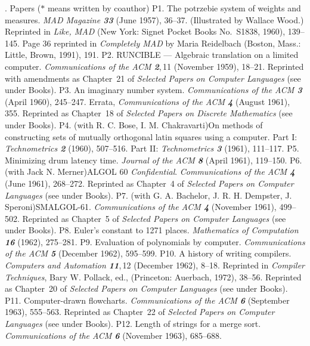 . {Papers \rm($\ast$ means written by coauthor)}
\p  P1.  The potrzebie system of weights and measures.  {\sl MAD Magazine\/
 \bf 33} (June 1957), 36--37.  (Illustrated by Wallace Wood.)  Reprinted 
 in {\sl Like, MAD\/} (New York:  Signet Pocket Books No.~S1838, 1960), 
 139--145. Page 36 reprinted in {\sl Completely MAD\/} by Maria Reidelbach
 (Boston, Mass.: Little, Brown, 1991), 191.
\p P2.  RUNCIBLE --- Algebraic translation on a limited computer.
 {\sl Commun\-i\-ca\-tions of the ACM\/ \bf 2},\,11 (November 1959), 18--21.  
 Reprinted with amendments as Chapter~21 of {\sl Selected Papers on
 Computer Languages\/} (see under Books).
\p P3.  An imaginary number system.  {\sl Communications of the
 ACM\/ \bf 3} (April 1960), 245--247.  Errata, {\sl Communications of the 
 ACM\/ \bf 4} (August 1961), 355.
 Reprinted as Chapter~18 of {\sl Selected Papers on
 Discrete Mathematics\/} (see under Books).
\p *P4.  (with R. C. Bose, I. M. Chakravarti)\xskip  On methods of constructing
 sets of mutually orthogonal latin squares using a computer.  Part I:
 {\sl Technometrics\/ \bf 2} (1960), 507--516.  Part II:  {\sl Technometrics\/
 \bf 3} (1961), 111--117.  
\p P5.  Minimizing drum latency time.  {\sl Journal of the 
 ACM\/ \bf 8} (April 1961), 119--150.  
\p P6.  (with Jack N. Merner)\xskip  ALGOL 60 {\it Confidential\/}.
 {\sl Commun\-i\-ca\-tions of the ACM\/ \bf 4} (June 1961), 268--272.  
 Reprinted as Chapter~4 of {\sl Selected Papers on
 Computer Languages\/} (see under Books).
\p P7.  (with G. A. Bachelor, J. R. H. Dempster, J. Speroni)\xskip  SMALGOL-61.
 {\sl Commun\-i\-ca\-tions of the ACM\/ \bf 4} (November 1961), 499--502.  
 Reprinted as Chapter~5 of {\sl Selected Papers on
 Computer Languages\/} (see under Books).
\p P8.  Euler's constant to 1271 places.
 {\sl Math\-e\-ma\-tics of Compu\-ta\-tion\/ \bf 16} (1962), 275--281.  
\p P9.  Evaluation of polynomials by computer. 
 {\sl Commun\-i\-ca\-tions of the ACM\/ \bf 5} (December 1962), 595--599.  
\p P10.  A history of writing compilers.  {\sl Computers and Automation\/
 \bf 11},\,12 (December 1962), 8--18.  Reprinted in {\sl Compiler Techniques},
 Bary W. Pollack, ed., (Prince\-ton:  Auerbach, 1972), 38--56.  %
 Reprinted as Chapter~20 of {\sl Selected Papers on
 Computer Languages\/} (see under Books).
\p P11.  Computer-drawn flowcharts.  {\sl Commun\-i\-ca\-tions of the
 ACM\/ \bf 6} (September 1963), 555--563.
 Reprinted as Chapter~22 of {\sl Selected Papers on
 Computer Languages\/} (see under Books).
\p P12.  Length of strings for a merge sort.  {\sl Commun\-i\-ca\-tions of the
 ACM\/ \bf 6} (November 1963), 685--688.  

